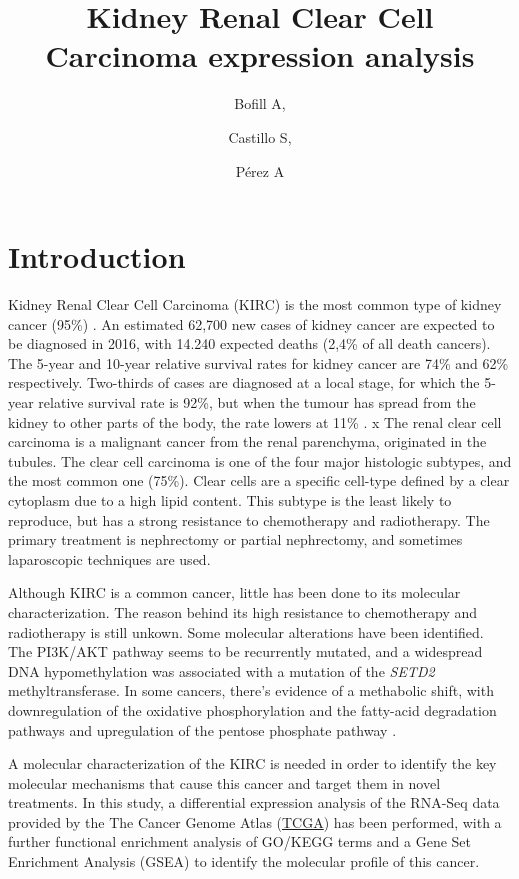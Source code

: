 \documentclass[9pt,twocolumn,twoside]{gsajnl}
\title{Kidney Renal Clear Cell Carcinoma expression analysis}
\author[$\ast$1]{Bofill A,}
\author[$\ast$1]{Castillo S,}
\author[$\ast$1]{Pérez A}
\affil[$\ast$]{Msc in Bioinformatics for Health Sciences, Pompeu Fabra University}
\begin{document}
\maketitle
\thispagestyle{firststyle}
\firstpagefootnote
{}
\vspace{-11pt}%


\section*{Introduction}

Kidney Renal Clear Cell Carcinoma (KIRC) is the most common type of kidney cancer (95\%) \citep{SEER}.  An estimated 62,700 new cases of kidney cancer are expected to be diagnosed in 2016, with 14.240 expected deaths (2,4\% of all death cancers).   The  5-year  and  10-year  relative  survival  rates  for  kidney  
cancer are 74\% and 62\% respectively.  Two-thirds of cases 
 are diagnosed at a local stage, for which the 5-year relative 
survival  rate  is  92\%, but when the tumour has spread from the kidney to other parts of the body, the rate lowers at 11\% \citep{SEER}. 
x	
The renal clear cell carcinoma is a malignant cancer from the renal parenchyma, originated in the tubules. The clear cell carcinoma is one of the four major histologic subtypes, and the most common one (75\%). Clear cells are a specific cell-type defined by a clear cytoplasm due to a high lipid content. This subtype is the least likely to reproduce, but has a strong resistance to chemotherapy and radiotherapy. The primary treatment is nephrectomy or partial nephrectomy, and sometimes laparoscopic techniques are used. 
	

Although KIRC is a common cancer, little has been done to its molecular characterization. The reason behind its high resistance to chemotherapy and radiotherapy is still unkown. Some molecular alterations have been identified. The PI3K/AKT pathway seems to be recurrently mutated, and a widespread DNA hypomethylation was associated with a mutation of the \textit{SETD2} methyltransferase. In some cancers, there's evidence of a methabolic shift, with downregulation of the oxidative phosphorylation  and the fatty-acid degradation pathways and upregulation of the pentose phosphate pathway \citep{Creighton2013}.

A molecular characterization of the KIRC is needed in order to identify the key molecular mechanisms that cause this cancer and target them in novel treatments. In this study,  a differential expression analysis of the RNA-Seq data provided by the The Cancer Genome Atlas (\href{http://www.cancergenome.nih.gov}{TCGA}) has been performed, with a further functional enrichment analysis of GO/KEGG terms and a Gene Set Enrichment Analysis (GSEA) to identify the molecular profile of this cancer.
\end{document}

